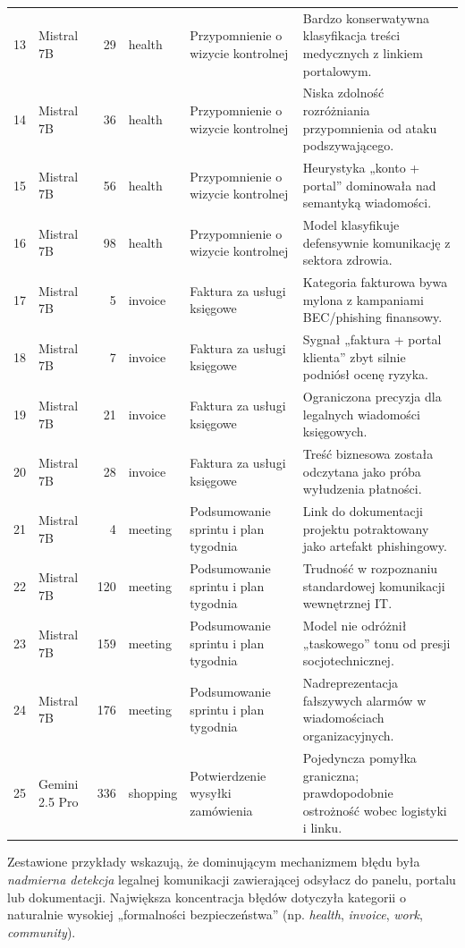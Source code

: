\documentclass[12pt,a4paper,openany]{report}
\begin{document}
\begin{center}
\begin{longtable}{r l r l p{3.2cm} p{4.8cm}}
13 & Mistral 7B & 29 & health & Przypomnienie o wizycie kontrolnej & Bardzo konserwatywna klasyfikacja treści medycznych z linkiem portalowym. \\
14 & Mistral 7B & 36 & health & Przypomnienie o wizycie kontrolnej & Niska zdolność rozróżniania przypomnienia od ataku podszywającego. \\
15 & Mistral 7B & 56 & health & Przypomnienie o wizycie kontrolnej & Heurystyka „konto + portal” dominowała nad semantyką wiadomości. \\
16 & Mistral 7B & 98 & health & Przypomnienie o wizycie kontrolnej & Model klasyfikuje defensywnie komunikację z sektora zdrowia. \\
17 & Mistral 7B & 5 & invoice & Faktura za usługi księgowe & Kategoria fakturowa bywa mylona z kampaniami BEC/phishing finansowy. \\
18 & Mistral 7B & 7 & invoice & Faktura za usługi księgowe & Sygnał „faktura + portal klienta” zbyt silnie podniósł ocenę ryzyka. \\
19 & Mistral 7B & 21 & invoice & Faktura za usługi księgowe & Ograniczona precyzja dla legalnych wiadomości księgowych. \\
20 & Mistral 7B & 28 & invoice & Faktura za usługi księgowe & Treść biznesowa została odczytana jako próba wyłudzenia płatności. \\
21 & Mistral 7B & 4 & meeting & Podsumowanie sprintu i plan tygodnia & Link do dokumentacji projektu potraktowany jako artefakt phishingowy. \\
22 & Mistral 7B & 120 & meeting & Podsumowanie sprintu i plan tygodnia & Trudność w rozpoznaniu standardowej komunikacji wewnętrznej IT. \\
23 & Mistral 7B & 159 & meeting & Podsumowanie sprintu i plan tygodnia & Model nie odróżnił „taskowego” tonu od presji socjotechnicznej. \\
24 & Mistral 7B & 176 & meeting & Podsumowanie sprintu i plan tygodnia & Nadreprezentacja fałszywych alarmów w wiadomościach organizacyjnych. \\
25 & Gemini 2.5 Pro & 336 & shopping & Potwierdzenie wysyłki zamówienia & Pojedyncza pomyłka graniczna; prawdopodobnie ostrożność wobec logistyki i linku. \\
\bottomrule
\end{longtable}
\end{center}

Zestawione przykłady wskazują, że dominującym mechanizmem błędu była \textit{nadmierna detekcja} legalnej komunikacji zawierającej odsyłacz do panelu, portalu lub dokumentacji. Największa koncentracja błędów dotyczyła kategorii o naturalnie wysokiej „formalności bezpieczeństwa” (np. \textit{health}, \textit{invoice}, \textit{work}, \textit{community}).
\end{document}
